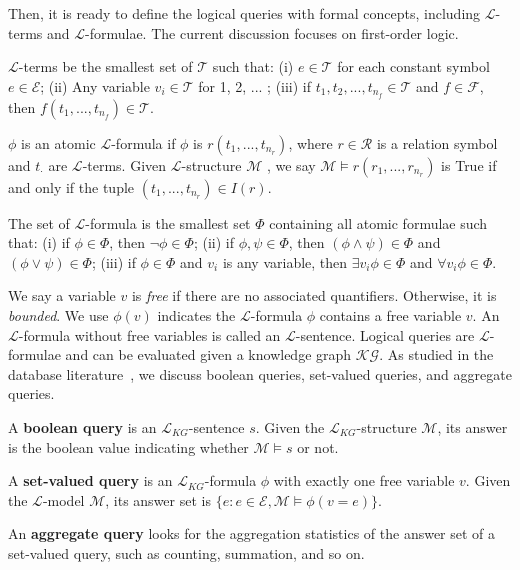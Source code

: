 \documentclass[11pt]{article}
\newcommand{\entity}{\mathcal{E}}
\newcommand{\relation}{\mathcal{R}}
\newcommand{\lang}{\mathcal{L}}
\newcommand{\model}{\mathcal{M}}
\newcommand{\term}{\mathcal{T}}
\newcommand{\kgnew}{\mathcal{KG}}
\begin{document}
Then, it is ready to define the logical queries with formal concepts, including $\lang$-terms and $\lang$-formulae.
The current discussion focuses on first-order logic.
\begin{definition}[$\lang$-term]\label{def:term}
$\lang$-terms be the smallest set of $\term$ such that:
(i) $e\in\term$ for each constant symbol $e \in \entity$;
(ii) Any variable $v_i \in \term$ for 1, 2, ... ;
(iii) if $t_1, t_2, ..., t_{n_f}\in \term$ and $f \in \mathcal{F}$, then $f(t_1, ..., t_{n_f}) \in \term$.
\end{definition}
\begin{definition}[Atomic $\lang$-formula]\label{def:atomic-formula}
    $\phi$ is an atomic $\lang$-formula if $\phi$ is $r(t_1, ..., t_{n_r})$, where $r\in \relation$ is a relation symbol and $t_\cdot$ are $\lang$-terms. Given $\lang$-structure $\model$ , we say $\model\models r(r_1, ..., r_{n_r})$ is True if and only if the tuple $(t_1, ..., t_{n_r})\in I(r)$.
\end{definition}
\begin{definition}[$\lang$-formula]\label{def:formula}
The set of $\lang$-formula is the smallest set $\Phi$ containing all atomic formulae such that: (i) if $\phi \in \Phi$, then $\lnot \phi \in \Phi$; (ii) if $\phi, \psi\in \Phi$, then $(\phi\land \psi) \in \Phi$ and $(\phi \lor \psi)\in \Phi$; (iii) if $\phi \in \Phi$ and $v_i$ is any variable, then $\exists v_i \phi \in \Phi$ and $\forall v_i \phi \in \Phi$.
\end{definition}
We say a variable $v$ is \textit{free} if there are no associated quantifiers. Otherwise, it is \textit{bounded}. We use $\phi(v)$ indicates the $\lang$-formula $\phi$ contains a free variable $v$. An $\lang$-formula without free variables is called an $\lang$-sentence. Logical queries are $\lang$-formulae and can be evaluated given a knowledge graph $\kgnew$.
As studied in the database literature~\cite{VandenBroeck2017QueryProcessing}, we discuss boolean queries, set-valued queries, and aggregate queries.

\noindent A \textbf{boolean query} is an $\lang_{KG}$-sentence $s$. Given the $\lang_{KG}$-structure $\model$, its answer is the boolean value indicating whether $\model \models s$ or not.

\noindent A \textbf{set-valued query} is an $\lang_{KG}$-formula $\phi$ with exactly one free variable $v$. Given  the $\lang$-model $\model$, its answer set is $\{e:  e\in \entity, \model\models \phi(v=e) \}$.

\noindent An \textbf{aggregate query} looks for the aggregation statistics of the answer set of a set-valued query, such as counting, summation, and so on.
\end{document}
